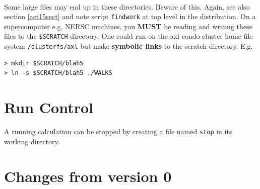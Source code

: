 \documentclass[10pt,leqno, oneside]{book}
\begin{document}
 \
 
Some large files may end up in these directories.  Beware of this.  Again, 
see also section \ref{act15sect} and note script \verb#findwork# at top level in the distribution.
On a supercomputer e.g. NERSC machines, you \textbf{MUST} be reading and writing these files to the \verb#$SCRATCH# directory.  
One could run on the axl condo cluster home file system \verb#/clusterfs/axl# 
but make \textbf{symbolic links} to the scratch directory.  E.g.
\begin{verbatim}
> mkdir $SCRATCH/blah5
> ln -s $SCRATCH/blah5 ./WALKS
\end{verbatim}








\section{Run Control}
A running calculation can be stopped by creating a file named \verb#stop# in its working directory.  

\section{Changes from version 0}
\end{document}
